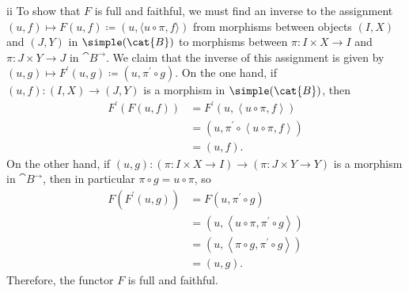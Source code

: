 \begin{partsolution}{ii}
To show that \(F\) is full and faithful, we must find an inverse to the assignment \((u,f) \mapsto F(u, f) \coloneq (u, \langle u\circ\pi,f\rangle)\) from morphisms between objects \((I, X)\) and \((J, Y)\) in \(\simple(\cat{B})\) to morphisms between \(\pi : I \times X \to I\) and \(\pi : J \times Y \to J\) in \(\cat{B}^\rightarrow\).
We claim that the inverse of this assignment is given by \((u, g) \mapsto F^\prime(u, g) \coloneq (u, \pi^\prime \circ g)\).
On the one hand, if \((u, f) : (I, X) \to (J, Y)\) is a morphism in \(\simple(\cat{B})\), then
\begin{align*}
F^\prime(F(u, f))
&= F^\prime\left(u, \left\langle u\circ\pi,f\right\rangle\right) \\
&= \left(u, \pi^\prime \circ \left\langle u\circ\pi,f\right\rangle\right) \\
&= (u, f).
\end{align*}
On the other hand, if \((u, g) : (\pi : I \times X \to I) \to (\pi : J \times Y \to Y)\) is a morphism in \(\cat{B}^\rightarrow\), then in particular \(\pi \circ g = u \circ \pi\), so
\begin{align*}
F(F^\prime(u, g))
&= F\left(u, \pi^\prime \circ g\right) \\
&= \left(u, \left\langle u\circ\pi, \pi^\prime \circ g\right\rangle\right) \\
&= \left(u, \left\langle \pi \circ g, \pi^\prime \circ g\right\rangle\right) \\
&= (u, g).
\end{align*}
Therefore, the functor \(F\) is full and faithful.


\end{partsolution}
